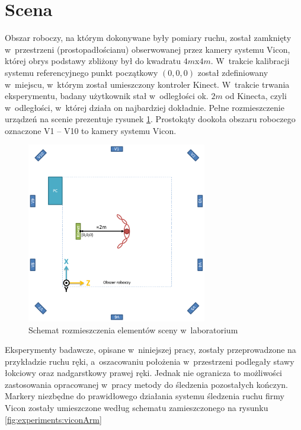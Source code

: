 \section{Scena}
Obszar roboczy, na którym dokonywane były pomiary ruchu, został zamknięty w~przestrzeni (prostopadłościanu) obserwowanej przez kamery systemu Vicon, której obrys podstawy zbliżony był do kwadratu $4m$x$4m$. W~trakcie kalibracji systemu referencyjnego punkt początkowy $\left(0, 0, 0\right)$ został zdefiniowany w~miejscu, w~którym został umieszczony kontroler Kinect.
W~trakcie trwania eksperymentu, badany użytkownik stał w~odległości ok. $2m$ od Kinecta, czyli w~odległości, w~której działa on najbardziej dokładnie.  Pełne rozmieszczenie urządzeń na scenie prezentuje rysunek \ref{fig:experiments:scene}. Prostokąty dookoła obszaru roboczego oznaczone V1 -- V10 to kamery systemu Vicon.
\begin{figure}[!htp]
	\centering
	\includegraphics[width=0.7\textwidth]{images/scene.png}
	\caption{Schemat rozmieszczenia elementów sceny w~laboratorium}
	\label{fig:experiments:scene}
\end{figure}
  
 
Eksperymenty badawcze, opisane w~niniejszej pracy, zostały przeprowadzone na przykładzie ruchu ręki, a~oszacowaniu położenia w~przestrzeni podlegały stawy łokciowy oraz nadgarstkowy prawej ręki.
Jednak nie ogranicza to możliwości zastosowania opracowanej w~pracy metody do śledzenia pozostałych kończyn. Markery niezbędne do prawidłowego działania systemu śledzenia ruchu firmy Vicon zostały umieszczone według schematu zamieszczonego na rysunku \ref{fig:experiments:viconArm}

